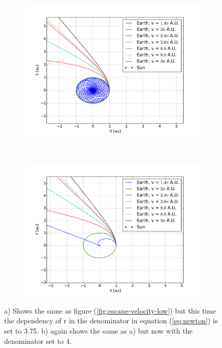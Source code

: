 \begin{figure}[H]
    \centering
    \begin{subfigure}{0.5\textwidth}
        \centering
        \includegraphics[width=\linewidth]{result/bilder/escape-velocity-r275.pdf}
    	\caption{}
    \end{subfigure}%
    ~ 
    \begin{subfigure}{0.5\textwidth}
        \centering
        \includegraphics[width=\linewidth]{result/bilder/escape-velocity-r3.pdf}
        \caption{}
    \end{subfigure}
    \caption{a) Shows the same as figure (\ref{fig:escape-velocity-low}) but this time the dependency of r in the denominator in equation (\ref{eq:newton}) is set to 3.75. b) again shows the same as a) but now with the denominator set to 4.}
    \label{fig:escape-velocity-high}
\end{figure}


